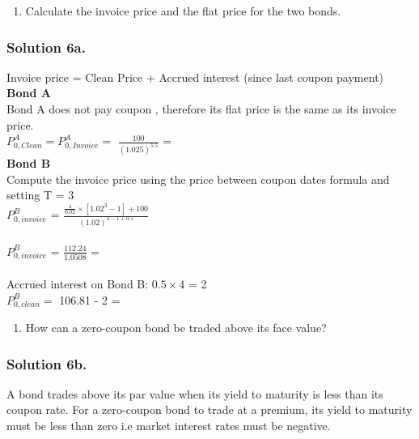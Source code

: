 \documentclass[12]{article}
\begin{document}
\begin{enumerate}
    \item[a)] Calculate the invoice price and the flat price for the two bonds.
\end{enumerate}

\color{blue}
\subsubsection*{Solution 6a.}
Invoice price = Clean Price + Accrued interest (since last coupon payment)\\
\textbf{Bond A}\\
Bond A does not pay coupon , therefore its flat price is the same as its invoice price.\\
$P_{0, Clean}^A = P_{0, Invoice }^A = $ {\Large $\frac{100}{(1.025)^{5.5}}$} = \\

\noindent
\textbf{Bond B}\\
\noindent
Compute the invoice price using the price between coupon dates formula and setting T = 3\\
$P_{0, invoice}^B $ = {\huge $\frac{\frac{4}{0.02} \times [1.02^3 -1] + 100 }{(1.02)^{3-1+0.5}}$}\\
\\
$P_{0, invoice}^B $ = {\Large $\frac{112.24}{1.0508}$}  = \\
\\
Accrued interest on Bond B: $0.5\times 4$ = 2\\
$P_{0, clean}^B =$ 106.81 - 2 = 



\noindent
\color{black}
\begin{enumerate}
    \item[b)] How can a zero-coupon bond be traded above its face value?
\end{enumerate}

\color{blue}
\subsubsection*{Solution 6b.}
A bond trades above its par value when its yield to maturity is less than its coupon rate. For a zero-coupon bond to trade at a premium, its yield to maturity must be less than zero i.e market interest rates must be negative.
\end{document}
